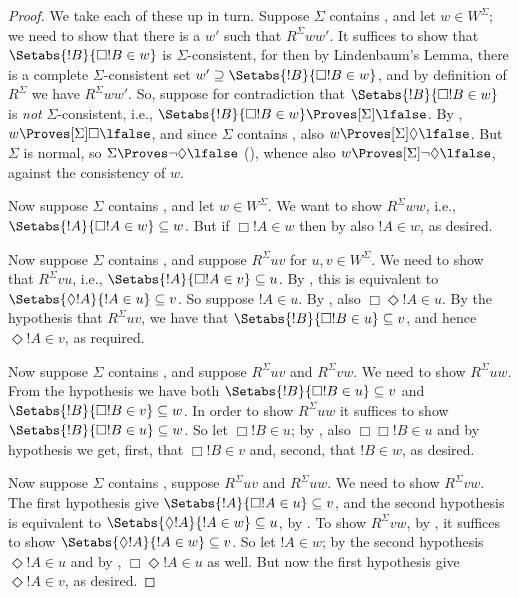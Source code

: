 \documentclass[../../../include/open-logic-section]{subfiles}
\begin{document}
\begin{proof}
  We take each of these up in turn. Suppose $\Sigma$ contains ,
  and let $w \in W^\Sigma$; we need to show that there is a $w'$ such
  that $R^\Sigma ww'$. It suffices to show that $\Setabs{!B}{\Box!B \in
  w}$ is $\Sigma$-consistent, for then by Lindenbaum's Lemma, there
  is a complete $\Sigma$-consistent set $w' \supseteq \Setabs{!B}{\Box!B
  \in w}$, and by definition of $R^\Sigma$ we have $R^\Sigma
  ww'$. So, suppose for contradiction that $\Setabs{!B}{\Box!B \in w}$ is
  \emph{not} $\Sigma$-consistent, i.e., $\Setabs{!B}{\Box!B \in w}
  \Proves[\Sigma] \lfalse$. By , $w
  \Proves[\Sigma] \Box\lfalse$, and since $\Sigma$ contains ,
  also $w \Proves[\Sigma] \Diamond\lfalse$. But $\Sigma$ is normal, so
  $\Sigma \Proves \lnot\Diamond \lfalse$
  (), whence also $w \Proves[\Sigma]
  \lnot\Diamond \lfalse$, against the consistency of $w$.

  Now suppose $\Sigma$ contains , and let $w \in W^\Sigma$. We
  want to show $R^\Sigma ww$, i.e., $\Setabs{!A}{\Box !A \in w} \subseteq
  w$. But if $\Box!A \in w$ then by  also $!A \in w$, as
  desired.

  Now suppose $\Sigma$ contains , and suppose $R^\Sigma uv$ for
  $u,v \in W^\Sigma$. We need to show that $R^\Sigma vu$, i.e.,
  $\Setabs{!A }{\Box!A \in v} \subseteq u$. By
  , this is equivalent to
  $\Setabs{\Diamond!A}{!A \in u} \subseteq v$. So suppose $!A \in
  u$. By , also $\Box\Diamond!A \in u$. By the hypothesis that
  $R^\Sigma uv$, we have that $\Setabs{!B}{\Box !B \in u} \subseteq
  v$, and hence $\Diamond!A \in v$, as required.

  Now suppose $\Sigma$ contains , and suppose $R^\Sigma uv$ and
  $R^\Sigma vw$. We need to show $R^\Sigma uw$. From the hypothesis we
  have both $\Setabs{!B}{\Box!B \in u} \subseteq v$ and
  $\Setabs{!B}{\Box!B \in v} \subseteq w$. In order to show $R^\Sigma
  uw$ it suffices to show $\Setabs{!B}{\Box!B \in u} \subseteq w$. So
  let $\Box!B \in u$; by , also $\Box\Box!B \in u$ and by
  hypothesis we get, first, that $\Box!B \in v$ and, second, that $!B
  \in w$, as desired.

  Now suppose $\Sigma$ contains , suppose $R^\Sigma uv$ and
  $R^\Sigma uw$. We need to show $R^\Sigma vw$. The first hypothesis
  give $\Setabs{!A}{\Box!A \in u} \subseteq v$, and the second
  hypothesis is equivalent to $\Setabs{\Diamond!A}{!A \in w} \subseteq
  u$, by .  To show $R^\Sigma vw$, by
  , it suffices to show
  $\Setabs{\Diamond!A}{!A \in w } \subseteq v$. So let $!A \in w$; by
  the second hypothesis $\Diamond!A \in u$ and by ,
  $\Box\Diamond!A \in u$ as well. But now the first hypothesis give
  $\Diamond!A \in v$, as desired.
  \end{proof}
\end{document}
